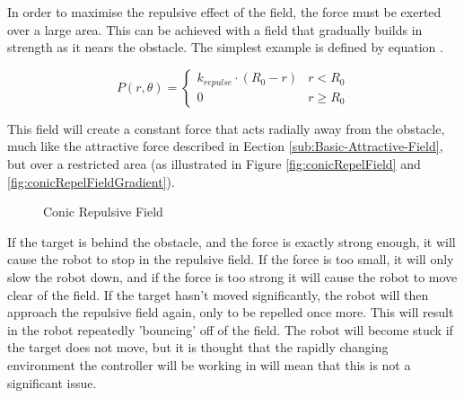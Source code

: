 \documentclass[10pt]{article}
\begin{document}
In order to maximise the repulsive effect of the field, the force must be
exerted over a large area. This can be achieved with a field that gradually
builds in strength as it nears the obstacle. The simplest example is defined by
equation .

\[
P\left(r,\theta\right)=\begin{cases}
k_{repulse}\cdot \left(R_{0} - r\right) & r<R_{0}\\
0 & r\geq R_{0}
\end{cases}
\]

This field will create a constant force that acts radially away from the
obstacle, much like the attractive force described in Eection
\ref{sub:Basic-Attractive-Field}, but over a restricted area (as illustrated in
Figure \ref{fig:conicRepelField} and \ref{fig:conicRepelFieldGradient}). 

\begin{figure}
 \centering
 \caption{Conic Repulsive Field}
\end{figure}

If the target is behind the obstacle, and the force is exactly strong enough, it
will cause the robot to stop in the repulsive field. If the force is too small,
it will only slow the robot down, and if the force is too strong it will cause
the robot to move clear of the field. If the target hasn't moved significantly,
the robot will then approach the repulsive field again, only to be repelled once
more. This will result in the robot repeatedly 'bouncing' off of the field. The
robot will become stuck if the target does not move, but it is thought that the
rapidly changing environment the controller will be working in will mean that
this is not a significant issue.
\end{document}
